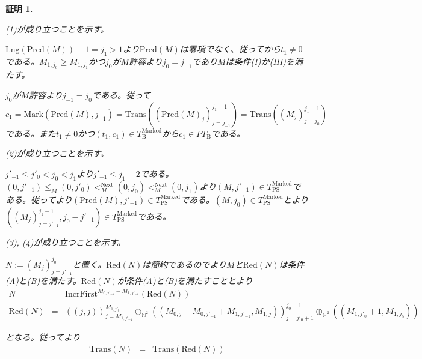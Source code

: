 \documentclass[dvipdfmx,uplatex]{jsarticle}
\theoremstyle{customnonumberbreakfortheorem}
\theoremstyle{customnonumberbreakforproof}
\newtheorem{hideableproof}{証明}
\begin{document}
\begin{hideableproof}
	\begin{indented}
		\item (1)が成り立つことを示す。
		\item \(\textrm{Lng}(\textrm{Pred}(M))-1 = j_1 > 1\)より\(\textrm{Pred}(M)\)は零項でなく、従ってから\(t_1 \neq 0\)である。\(M_{1,j_0} \geq M_{1,j_1}\)かつ\(j_0\)が\(M\)許容より\(j_0 = j_{-1}\)であり\(M\)は条件(I)か(III)を満たす。
		\item \(j_0\)が\(M\)許容より\(j_{-1} = j_0\)である。従って\(c_1 = \textrm{Mark}(\textrm{Pred}(M),j_{-1}) = \textrm{Trans}((\textrm{Pred}(M)_j)_{j=j_{-1}}^{j_1-1}) = \textrm{Trans}((M_j)_{j=j_0}^{j_1-1})\)である。また\(t_1 \neq 0\)かつ\((t_1,c_1) \in T_{\textrm{B}}^{\textrm{Marked}}\)から\(c_1 \in PT_{\textrm{B}}\)である。
		\item
		\item (2)が成り立つことを示す。
		\item \(j'_{-1} \leq j'_0 < j_0 < j_1\)より\(j'_{-1} \leq j_1-2\)である。\((0,j'_{-1}) \leq_M (0,j'_0) <_M^{\textrm{Next}} (0,j_0) <_M^{\textrm{Next}} (0,j_1)\)より\((M,j'_{-1}) \in T_{\textrm{PS}}^{\textrm{Marked}}\)である。従ってより\((\textrm{Pred}(M),j'_{-1}) \in T_{\textrm{PS}}^{\textrm{Marked}}\)である。\((M,j_0) \in T_{\textrm{PS}}^{\textrm{Marked}}\)とより\(((M_j)_{j=j'_{-1}}^{j_1-1},j_0-j'_{-1}) \in T_{\textrm{PS}}^{\textrm{Marked}}\)である。
		\item
		\item (3), (4)が成り立つことを示す。
		\item \(N := (M_j)_{j=j'_{-1}}^{j_0}\)と置く。\(\textrm{Red}(N)\)は簡約であるのでより\(M\)と\(\textrm{Red}(N)\)は条件(A)と(B)を満たす。\(\textrm{Red}(N)\)が条件(A)と(B)を満たすこととより
		\begin{eqnarray*}
		N & = & \textrm{IncrFirst}^{M_{0,j'_{-1}}-M_{1,j'_{-1}}}(\textrm{Red}(N)) \\
		\textrm{Red}(N) & = & ((j,j))_{j=M_{1,j'_{-1}}}^{M_{1,j'_0}} \oplus_{\mathbb{N}^2} ((M_{0,j}-M_{0,j'_{-1}}+M_{1,j'_{-1}},M_{1,j}))_{j=j'_0+1}^{j_0-1} \oplus_{\mathbb{N}^2} ((M_{1,j'_0}+1,M_{1,j_0}))
		\end{eqnarray*}
		\item となる。従ってより
		\begin{eqnarray*}
		\textrm{Trans}(N) & = & \textrm{Trans}(\textrm{Red}(N)) \\

\end{eqnarray*}
\end{indented}
\end{hideableproof}
\end{document}
